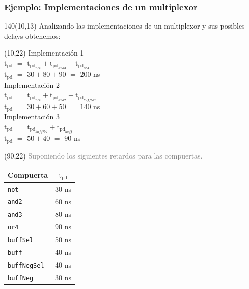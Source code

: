 \documentclass[aspectratio=169]{beamer}
\begin{document}
\begin{frame}[fragile,t]
    \frametitle{Ejemplo: Implementaciones de un multiplexor}
    \begin{textblock}{140}(10,13)
    Analizando las implementaciones de un multiplexor y sus posibles delays obtenemos:
    \end{textblock}
    \begin{textblock}{50}(10,22)
    \textcolor{naranjauca}{Implementación 1}\\
    $\text{t}_{\text{pd}}$ $=$ $\text{t}_{\text{pd}_{not}} + \text{t}_{\text{pd}_{and3}} + \text{t}_{\text{pd}_{or4}}$\\
    $\text{t}_{\text{pd}}$ $=$ $30 + 80 + 90$ $=$ $200$ ns\\
    \vspace{0.5cm}
    \textcolor{naranjauca}{Implementación 2}\\
    $\text{t}_{\text{pd}}$ $=$ $\text{t}_{\text{pd}_{not}} + \text{t}_{\text{pd}_{and2}} + \text{t}_{\text{pd}_{buffSel}}$\\
    $\text{t}_{\text{pd}}$ $=$ $30 + 60 + 50$ $=$ $140$ ns\\
    \vspace{0.5cm}
    \textcolor{naranjauca}{Implementación 3}\\
    $\text{t}_{\text{pd}}$ $=$ $\text{t}_{\text{pd}_{buffSel}} + \text{t}_{\text{pd}_{buff}}$\\
    $\text{t}_{\text{pd}}$ $=$ $50 + 40$ $=$ $90$ ns\\
    \end{textblock}
    \begin{textblock}{40}(90,22)
    \small \textcolor{gray}{Suponiendo los siguientes retardos para las compuertas.}\\
    \vspace{.3cm}
    \begin{tabular}{|l|c|}
    \hline
    Compuerta & $\text{t}_{\text{pd}}$ \\
    \hline
    \texttt{not}        & 30 ns \\
    \texttt{and2}       & 60 ns \\
    \texttt{and3}       & 80 ns \\
    \texttt{or4}        & 90 ns \\
    \texttt{buffSel}    & 50 ns \\
    \texttt{buff}       & 40 ns \\
    \texttt{buffNegSel} & 40 ns \\
    \texttt{buffNeg}    & 30 ns \\
    \hline
    \end{tabular}
    \end{textblock}
\end{frame}
\end{document}
